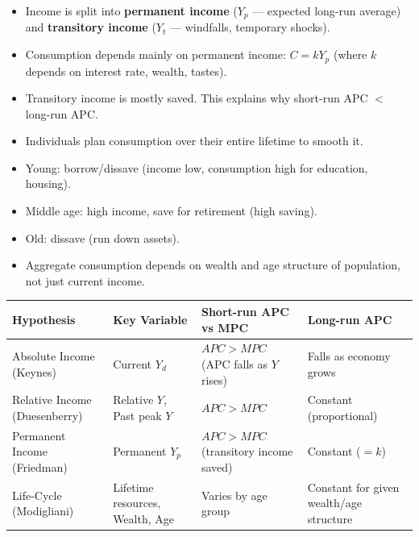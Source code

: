 \documentclass[11pt]{article}
\begin{document}
\begin{definition}
\begin{itemize}
    \item Income is split into \textbf{permanent income} ($Y_p$ — expected long-run average) and \textbf{transitory income} ($Y_t$ — windfalls, temporary shocks).
    \item Consumption depends mainly on permanent income: $C = k Y_p$ (where $k$ depends on interest rate, wealth, tastes).
    \item Transitory income is mostly saved. This explains why short-run APC $<$ long-run APC.
\end{itemize}
\end{definition}

\begin{definition}
\begin{itemize}
    \item Individuals plan consumption over their entire lifetime to smooth it.
    \item Young: borrow/dissave (income low, consumption high for education, housing).
    \item Middle age: high income, save for retirement (high saving).
    \item Old: dissave (run down assets).
    \item Aggregate consumption depends on wealth and age structure of population, not just current income.
\end{itemize}
\end{definition}

\begin{aretenir}
\begin{center}
\begin{tabularx}{\linewidth}{|l|X|X|X|}\hline
\textbf{Hypothesis} & \textbf{Key Variable} & \textbf{Short-run APC vs MPC} & \textbf{Long-run APC} \\ \hline
Absolute Income (Keynes) & Current $Y_d$ & $APC > MPC$ (APC falls as $Y$ rises) & Falls as economy grows \\ \hline
Relative Income (Duesenberry) & Relative $Y$, Past peak $Y$ & $APC > MPC$ & Constant (proportional) \\ \hline
Permanent Income (Friedman) & Permanent $Y_p$ & $APC > MPC$ (transitory income saved) & Constant ($= k$) \\ \hline
Life-Cycle (Modigliani) & Lifetime resources, Wealth, Age & Varies by age group & Constant for given wealth/age structure \\ \hline
\end{tabularx}
\end{center}
\end{aretenir}
\end{document}
